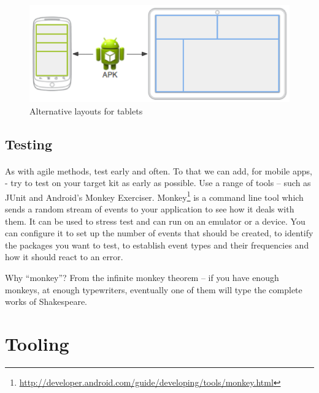 \documentclass[12pt, a4paper, twoside]{book}
\begin{document}
\begin{figure}[H]%
\centering
\includegraphics[width=\textwidth]{images/res-layout-alt}
\caption{Alternative layouts for tablets}
\label{fig:res-layout-alt}
\end{figure}

\subsection{Testing}
\paragraph{} As with agile methods, test early and often. To that we can add, for mobile apps, - try to test on your target kit as early as possible. Use a range of tools – such as JUnit and Android’s Monkey Exerciser. Monkey\footnote{\url{http://developer.android.com/guide/developing/tools/monkey.html}} is a command line tool which sends a random stream of events to your application to see how it deals with them. It can be used to stress test and can run on an emulator or a device. You can configure it to set up the number of events that should be created, to identify the packages you want to test, to establish event types and their frequencies and how it should react to an error. 

\begin{framed}
Why ``monkey''? From the infinite monkey theorem – if you have enough monkeys, at enough typewriters, eventually one of them will type the complete works of Shakespeare.
\end{framed}



\section{Tooling}
\end{document}
